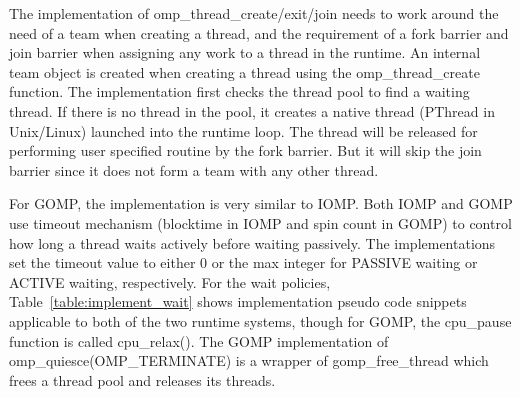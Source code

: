 The implementation of  {\sf omp\_thread\_create/exit/join} needs to work around the need of a team when creating a thread, and the requirement 
of a fork barrier and join barrier when assigning any work to a thread in the runtime. An internal team object is created when creating a thread 
using the {\sf omp\_thread\_create} function. The implementation first checks the thread pool to find a waiting thread. If there is no thread
in the pool, it creates a native thread (PThread in Unix/Linux) launched into the runtime loop. The thread will be released for performing
user specified routine by the fork barrier. But it will skip the join barrier since it does not form a team with any other thread. 

For GOMP, the implementation is very similar to IOMP.
Both IOMP and GOMP use timeout mechanism (blocktime in IOMP and spin count in GOMP) 
to control how long a thread waits actively before waiting passively. The implementations set the timeout value to either 0 or the max integer 
for {\sf PASSIVE} waiting or {\sf ACTIVE} waiting, respectively. 
For the wait policies, Table~\ref{table:implement_wait} shows implementation pseudo code snippets applicable to both of 
the two runtime systems, though for GOMP, the cpu\_pause function is called cpu\_relax().  
The GOMP implementation of {\sf omp\_quiesce(OMP\_TERMINATE)} is a wrapper of {\sf gomp\_free\_thread} 
which frees a thread pool and releases its threads. 


